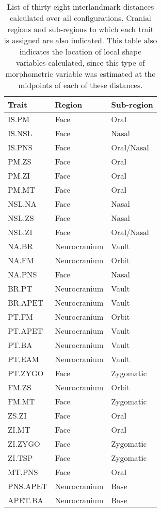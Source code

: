 \begin {table}[hp]
  \centering
  \caption {List of thirty-eight interlandmark distances calculated over all configurations. Cranial regions and sub-regions to which each trait is assigned are also indicated. This table also indicates the location of local shape variables calculated, since this type of morphometric variable was estimated at the midpoints of each of these distances.}
  \label {tab:dist}
  \hr
  \begin {tabularx} {\textwidth} {X X X}
    {\bf Trait} & {\bf Region} & {\bf Sub-region}  \\
    \hline
    IS.PM & Face & Oral \\
    IS.NSL & Face & Nasal \\
    IS.PNS & Face & Oral/Nasal \\
    PM.ZS & Face & Oral \\
    PM.ZI & Face & Oral \\
    PM.MT & Face & Oral \\
    NSL.NA & Face & Nasal \\
    NSL.ZS & Face & Nasal \\
    NSL.ZI & Face & Oral/Nasal \\
    NA.BR & Neurocranium & Vault \\
    NA.FM & Neurocranium & Orbit \\
    NA.PNS & Face & Nasal \\
    BR.PT & Neurocranium & Vault \\
    BR.APET & Neurocranium & Vault \\
    PT.FM & Neurocranium & Orbit \\
    PT.APET & Neurocranium & Vault \\
    PT.BA & Neurocranium & Vault \\
    PT.EAM & Neurocranium & Vault \\
    PT.ZYGO & Face & Zygomatic \\
    FM.ZS & Neurocranium & Orbit \\
    FM.MT & Face & Zygomatic \\
    ZS.ZI & Face & Oral \\
    ZI.MT & Face & Oral \\
    ZI.ZYGO & Face & Zygomatic \\
    ZI.TSP & Face & Zygomatic \\
    MT.PNS & Face & Oral \\
    PNS.APET & Neurocranium & Base \\
    APET.BA & Neurocranium & Base \\

\end{tabularx}
\end{table}
